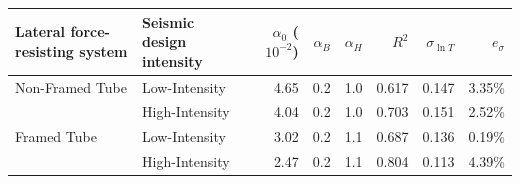 \begin{tabular}{llrrrrrr}
\toprule
Lateral force-resisting system & Seismic design intensity & $\alpha_0$ ($10^{-2}$) & $\alpha_B$ & $\alpha_H$ & $R^2$ & $\sigma_{\ln T}$ & $e_{\sigma}$ \\
\midrule
Non-Framed Tube & Low-Intensity & 4.65 & 0.2 & 1.0 & 0.617 & 0.147 & 3.35\% \\
 & High-Intensity & 4.04 & 0.2 & 1.0 & 0.703 & 0.151 & 2.52\% \\
Framed Tube & Low-Intensity & 3.02 & 0.2 & 1.1 & 0.687 & 0.136 & 0.19\% \\
 & High-Intensity & 2.47 & 0.2 & 1.1 & 0.804 & 0.113 & 4.39\% \\
\bottomrule
\end{tabular}
